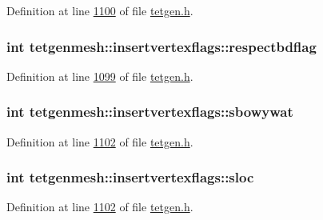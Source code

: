 Definition at line \hyperlink{tetgen_8h_source_l01100}{1100} of file \hyperlink{tetgen_8h_source}{tetgen.\+h}.

\subsubsection[{\texorpdfstring{respectbdflag}{respectbdflag}}]{\setlength{\rightskip}{0pt plus 5cm}int tetgenmesh\+::insertvertexflags\+::respectbdflag}\hypertarget{classtetgenmesh_1_1insertvertexflags_ae953afe4a3a59188b59fabe96cfe1d47}{}\label{classtetgenmesh_1_1insertvertexflags_ae953afe4a3a59188b59fabe96cfe1d47}


Definition at line \hyperlink{tetgen_8h_source_l01099}{1099} of file \hyperlink{tetgen_8h_source}{tetgen.\+h}.

\subsubsection[{\texorpdfstring{sbowywat}{sbowywat}}]{\setlength{\rightskip}{0pt plus 5cm}int tetgenmesh\+::insertvertexflags\+::sbowywat}\hypertarget{classtetgenmesh_1_1insertvertexflags_a9d380c4151120f6d0008ee61a0f410d3}{}\label{classtetgenmesh_1_1insertvertexflags_a9d380c4151120f6d0008ee61a0f410d3}


Definition at line \hyperlink{tetgen_8h_source_l01102}{1102} of file \hyperlink{tetgen_8h_source}{tetgen.\+h}.

\subsubsection[{\texorpdfstring{sloc}{sloc}}]{\setlength{\rightskip}{0pt plus 5cm}int tetgenmesh\+::insertvertexflags\+::sloc}\hypertarget{classtetgenmesh_1_1insertvertexflags_abe0f4992169d636639d0f389a674a68f}{}\label{classtetgenmesh_1_1insertvertexflags_abe0f4992169d636639d0f389a674a68f}


Definition at line \hyperlink{tetgen_8h_source_l01102}{1102} of file \hyperlink{tetgen_8h_source}{tetgen.\+h}.

